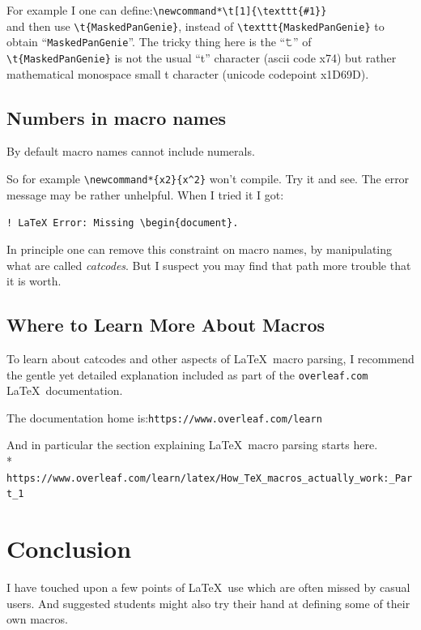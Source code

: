 \documentclass{article}
\newcommand*\𝚝[1]{\texttt{#1}}%
\begin{document}
For example I one can define:\quad \verb|\newcommand*\𝚝[1]{\texttt{#1}}|\\
and then use \verb|\𝚝{MaskedPanGenie}|, instead of \verb|\texttt{MaskedPanGenie}| to
obtain ``\𝚝{MaskedPanGenie}''.  The tricky thing here is the ``𝚝'' of \verb|\𝚝{MaskedPanGenie}| is
not the usual ``t'' character (ascii code x74) but rather mathematical monospace small t character (unicode codepoint x1D69D).


\subsection*{Numbers in macro names}
By default macro names cannot include numerals.

So for example \verb|\newcommand*{x2}{x^2}| won't compile.  Try it and see.
The error message may be rather unhelpful.
When I tried it I got:

\begin{center}\verb|! LaTeX Error: Missing \begin{document}.|\end{center}

In principle one can remove this constraint on macro names, by manipulating what are called \textit{catcodes}.
But I suspect you may find that path more trouble that it is worth.

\subsection*{Where to Learn More About Macros}
To learn about catcodes and other aspects of \LaTeX\ macro parsing,
I recommend the gentle yet detailed explanation included as part of the \𝚝{overleaf.com} \LaTeX\ documentation.

The documentation home is:\quad \verb|https://www.overleaf.com/learn|

And in particular the section explaining \LaTeX\ macro parsing starts here.\\*
\verb|https://www.overleaf.com/learn/latex/How_TeX_macros_actually_work:_Part_1|


\section*{Conclusion}
I have touched upon a few points of \LaTeX\ use which are often missed by casual users.
And suggested students might also try their hand at defining some of their own macros.
\end{document}
